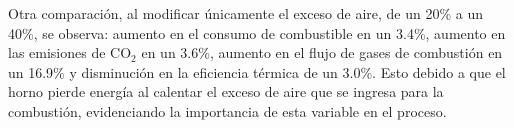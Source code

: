 \par Otra comparación, al modificar únicamente el exceso de aire, de un 20\% a un 40\%, se observa: aumento en el consumo de combustible en un 3.4\%, aumento en las emisiones de CO$_2$ en un 3.6\%, aumento en el flujo de gases de combustión en un 16.9\% y disminución en la eficiencia térmica de un 3.0\%. Esto debido a que el horno pierde energía al calentar el exceso de aire que se ingresa para la combustión, evidenciando la importancia de esta variable en el proceso.

